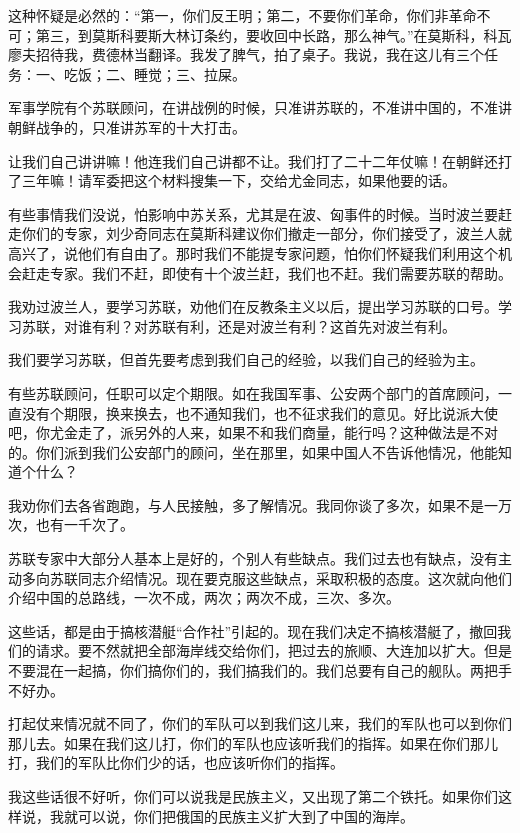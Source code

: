 这种怀疑是必然的：“第一，你们反王明；第二，不要你们革命，你们非革命不可；第三，到莫斯科要斯大林订条约，要收回中长路，那么神气。”在莫斯科，科瓦廖夫招待我，费德林当翻译。我发了脾气，拍了桌子。我说，我在这儿有三个任务：一、吃饭；二、睡觉；三、拉屎。

军事学院有个苏联顾问，在讲战例的时候，只准讲苏联的，不准讲中国的，不准讲朝鲜战争的，只准讲苏军的十大打击。

让我们自己讲讲嘛！他连我们自己讲都不让。我们打了二十二年仗嘛！在朝鲜还打了三年嘛！请军委把这个材料搜集一下，交给尤金同志，如果他要的话。

有些事情我们没说，怕影响中苏关系，尤其是在波、匈事件的时候。当时波兰要赶走你们的专家，刘少奇同志在莫斯科建议你们撤走一部分，你们接受了，波兰人就高兴了，说他们有自由了。那时我们不能提专家问题，怕你们怀疑我们利用这个机会赶走专家。我们不赶，即使有十个波兰赶，我们也不赶。我们需要苏联的帮助。

我劝过波兰人，要学习苏联，劝他们在反教条主义以后，提出学习苏联的口号。学习苏联，对谁有利？对苏联有利，还是对波兰有利？这首先对波兰有利。

我们要学习苏联，但首先要考虑到我们自己的经验，以我们自己的经验为主。

有些苏联顾问，任职可以定个期限。如在我国军事、公安两个部门的首席顾问，一直没有个期限，换来换去，也不通知我们，也不征求我们的意见。好比说派大使吧，你尤金走了，派另外的人来，如果不和我们商量，能行吗？这种做法是不对的。你们派到我们公安部门的顾问，坐在那里，如果中国人不告诉他情况，他能知道个什么？

我劝你们去各省跑跑，与人民接触，多了解情况。我同你谈了多次，如果不是一万次，也有一千次了。

苏联专家中大部分人基本上是好的，个别人有些缺点。我们过去也有缺点，没有主动多向苏联同志介绍情况。现在要克服这些缺点，采取积极的态度。这次就向他们介绍中国的总路线，一次不成，两次；两次不成，三次、多次。

这些话，都是由于搞核潜艇“合作社”引起的。现在我们决定不搞核潜艇了，撤回我们的请求。要不然就把全部海岸线交给你们，把过去的旅顺、大连加以扩大。但是不要混在一起搞，你们搞你们的，我们搞我们的。我们总要有自己的舰队。两把手不好办。

打起仗来情况就不同了，你们的军队可以到我们这儿来，我们的军队也可以到你们那儿去。如果在我们这儿打，你们的军队也应该听我们的指挥。如果在你们那儿打，我们的军队比你们少的话，也应该听你们的指挥。

我这些话很不好听，你们可以说我是民族主义，又出现了第二个铁托。如果你们这样说，我就可以说，你们把俄国的民族主义扩大到了中国的海岸。

